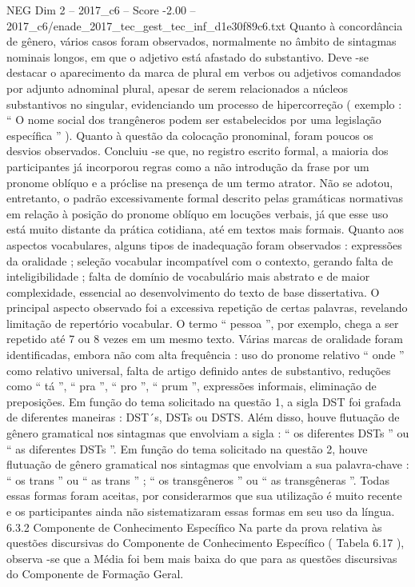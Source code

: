 \begin{textsample}{NEG Dim 2 – 2017\_c6 – Score -2.00 – 2017\_c6/enade\_2017\_tec\_gest\_tec\_inf\_d1e30f89c6.txt}
Quanto à concordância de gênero, vários casos foram observados, normalmente no âmbito de sintagmas nominais longos, em que o adjetivo está afastado do substantivo.
Deve -se destacar o aparecimento da marca de plural em verbos ou adjetivos comandados por adjunto adnominal plural, apesar de serem relacionados a núcleos substantivos no singular, evidenciando um processo de hipercorreção ( exemplo : “ O nome social dos trangêneros podem ser estabelecidos por uma legislação específica ” ).
Quanto à questão da colocação pronominal, foram poucos os desvios observados.
Concluiu -se que, no registro escrito formal, a maioria dos participantes já incorporou regras como a não introdução da frase por um pronome oblíquo e a próclise na presença de um termo atrator.
Não se adotou, entretanto, o padrão excessivamente formal descrito pelas gramáticas normativas em relação à posição do pronome oblíquo em locuções verbais, já que esse uso está muito distante da prática cotidiana, até em textos mais formais.
Quanto aos aspectos vocabulares, alguns tipos de inadequação foram observados : expressões da oralidade ; seleção vocabular incompatível com o contexto, gerando falta de inteligibilidade ; falta de domínio de vocabulário mais abstrato e de maior complexidade, essencial ao desenvolvimento do texto de base dissertativa.
O principal aspecto observado foi a excessiva repetição de certas palavras, revelando limitação de repertório vocabular.
O termo “ pessoa ”, por exemplo, chega a ser repetido até 7 ou 8 vezes em um mesmo texto.
Várias marcas de oralidade foram identificadas, embora não com alta frequência : uso do pronome relativo “ onde ” como relativo universal, falta de artigo definido antes de substantivo, reduções como “ tá ”, “ pra ”, “ pro ”, “ prum ”, expressões informais, eliminação de preposições.
Em função do tema solicitado na questão 1, a sigla DST foi grafada de diferentes maneiras : DST´s, DSTs ou DSTS.
Além disso, houve flutuação de gênero gramatical nos sintagmas que envolviam a sigla : “ os diferentes DSTs ” ou “ as diferentes DSTs ”.
Em função do tema solicitado na questão 2, houve flutuação de gênero gramatical nos sintagmas que envolviam a sua palavra-chave : “ os trans ” ou “ as trans ” ; “ os transgêneros ” ou “ as transgêneras ”.
Todas essas formas foram aceitas, por considerarmos que sua utilização é muito recente e os participantes ainda não sistematizaram essas formas em seu uso da língua. 6.3.2 Componente de Conhecimento Específico Na parte da prova relativa às questões discursivas do Componente de Conhecimento Específico ( Tabela 6.17 ), observa -se que a Média foi bem mais baixa do que para as questões discursivas do Componente de Formação Geral.

\end{textsample}
